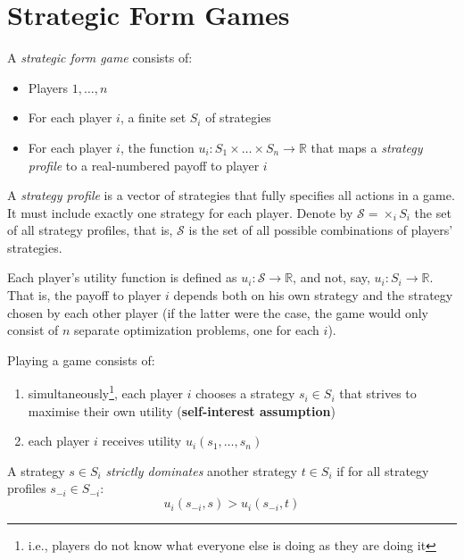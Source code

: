 \section{Strategic Form Games}
	\begin{definition}
		A \textit{strategic form game} consists of:
		\begin{itemize}
			\itemsep0em
			\item Players ${1, \ldots, n}$
			\item For each player $i$, a finite set $S_i$ of strategies
			\item For each player $i$, the function $u_i : S_1 \times \ldots \times S_n \rightarrow \mathbb{R}$ that maps a \textit{strategy profile} to a real-numbered payoff to player $i$
		\end{itemize}
	\end{definition}

	A \textit{strategy profile} is a vector of strategies that fully specifies
	all actions in a game. It must include exactly one strategy for each
	player. Denote by $\mathcal{S} = \times_i S_i$ the set of all strategy
	profiles, that is, $\mathcal{S}$ is the set of all possible combinations of
	players' strategies.

	\begin{remark}
		Each player's utility function is defined as $u_i : \mathcal{S}
		\rightarrow \mathbb{R}$, and not, say, $u_i : S_i \rightarrow \mathbb{R}$.
		That is, the payoff to player $i$ depends both on his own strategy and
		the strategy chosen by each other player (if the latter were the case,
		the game would only consist of $n$ separate optimization problems, one
		for each $i$).
	\end{remark}

	Playing a game consists of:
	\begin{enumerate}
		\itemsep0em
		\item simultaneously\footnote{i.e., players do not know what everyone else is doing as they are doing it}, each player $i$ chooses a strategy $s_i \in S_i$ that strives to maximise their own utility (\textbf{self-interest assumption})
		\item each player $i$ receives utility $u_i(s_1, \ldots, s_n)$
	\end{enumerate}

	\begin{definition}
		A strategy $s \in S_i$ \textit{strictly dominates} another strategy $t
		\in S_i$ if for all strategy profiles $s_{-i} \in S_{-i}$:
		\begin{equation}
			u_i(s_{-i}, s) > u_i(s_{-i}, t)
		\end{equation}
	\end{definition}

